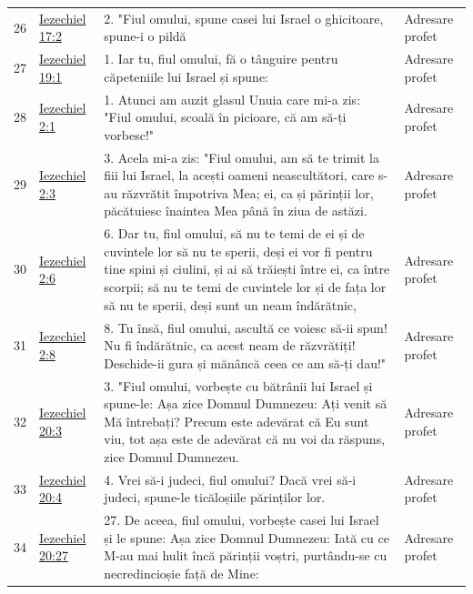 \documentclass[12pt,a4paper,twoside,openany]{book}
\begin{document}
\begin{longtable}{L{0.8cm}L{1.2cm}L{11.9cm}L{0.8cm}}
26 & \href{https://bibliaortodoxa.ro/carte.php?id=33\&cap=17\#2}{Iezechiel 17:2} & 2. "Fiul omului, spune casei lui Israel o ghicitoare, spune-i o pildă & Adresare profet \\
27 & \href{https://bibliaortodoxa.ro/carte.php?id=33\&cap=19\#1}{Iezechiel 19:1} & 1. Iar tu, fiul omului, fă o tânguire pentru căpeteniile lui Israel și spune: & Adresare profet \\
28 & \href{https://bibliaortodoxa.ro/carte.php?id=33\&cap=2\#1}{Iezechiel 2:1} & 1. Atunci am auzit glasul Unuia care mi-a zis: "Fiul omului, scoală în picioare, că am să-ți vorbesc!" & Adresare profet \\
29 & \href{https://bibliaortodoxa.ro/carte.php?id=33\&cap=2\#3}{Iezechiel 2:3} & 3. Acela mi-a zis: "Fiul omului, am să te trimit la fiii lui Israel, la acești oameni neascultători, care s-au răzvrătit împotriva Mea; ei, ca și părinții lor, păcătuiesc înaintea Mea până în ziua de astăzi. & Adresare profet \\
30 & \href{https://bibliaortodoxa.ro/carte.php?id=33\&cap=2\#6}{Iezechiel 2:6} & 6. Dar tu, fiul omului, să nu te temi de ei și de cuvintele lor să nu te sperii, deși ei vor fi pentru tine spini și ciulini, și ai să trăiești între ei, ca între scorpii; să nu te temi de cuvintele lor și de fața lor să nu te sperii, deși sunt un neam îndărătnic, & Adresare profet \\
31 & \href{https://bibliaortodoxa.ro/carte.php?id=33\&cap=2\#8}{Iezechiel 2:8} & 8. Tu însă, fiul omului, ascultă ce voiesc să-ii spun! Nu fi îndărătnic, ca acest neam de răzvrătiți! Deschide-ii gura și mănâncă ceea ce am să-ți dau!" & Adresare profet \\
32 & \href{https://bibliaortodoxa.ro/carte.php?id=33\&cap=20\#3}{Iezechiel 20:3} & 3. "Fiul omului, vorbește cu bătrânii lui Israel și spune-le: Așa zice Domnul Dumnezeu: Ați venit să Mă întrebați? Precum este adevărat că Eu sunt viu, tot așa este de adevărat că nu voi da răspuns, zice Domnul Dumnezeu. & Adresare profet \\
33 & \href{https://bibliaortodoxa.ro/carte.php?id=33\&cap=20\#4}{Iezechiel 20:4} & 4. Vrei să-i judeci, fiul omului? Dacă vrei să-i judeci, spune-le ticăloșiile părinților lor. & Adresare profet \\
34 & \href{https://bibliaortodoxa.ro/carte.php?id=33\&cap=20\#27}{Iezechiel 20:27} & 27. De aceea, fiul omului, vorbește casei lui Israel și le spune: Așa zice Domnul Dumnezeu: Iată cu ce M-au mai hulit încă părinții voștri, purtându-se cu necredincioșie față de Mine: & Adresare profet \\

\end{longtable}
\end{document}
